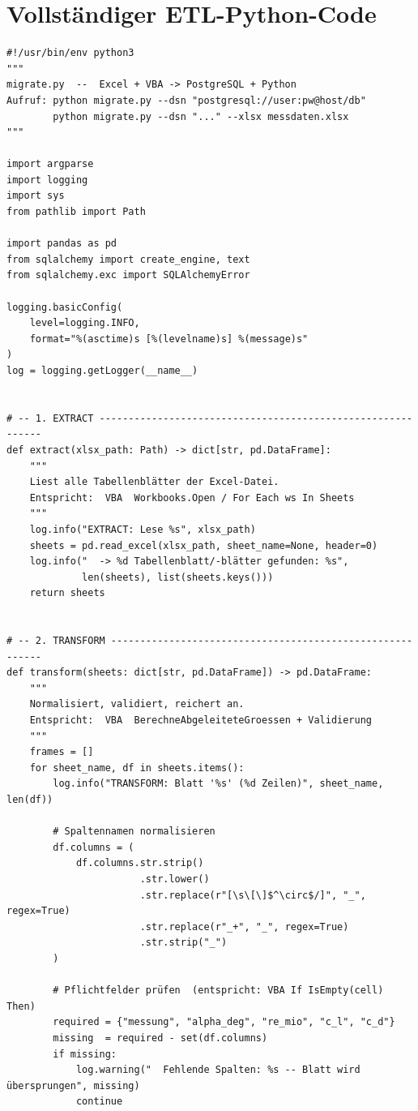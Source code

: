 ﻿\documentclass[12pt,a4paper]{report}
\theoremstyle{definition}
\theoremstyle{remark}
\begin{document}
\section{Vollständiger ETL-Python-Code}

\begin{lstlisting}[style=python, caption={migrate.py: Vollständige ETL-Pipeline}, label=lst:etl]
#!/usr/bin/env python3
"""
migrate.py  --  Excel + VBA -> PostgreSQL + Python
Aufruf: python migrate.py --dsn "postgresql://user:pw@host/db"
        python migrate.py --dsn "..." --xlsx messdaten.xlsx
"""

import argparse
import logging
import sys
from pathlib import Path

import pandas as pd
from sqlalchemy import create_engine, text
from sqlalchemy.exc import SQLAlchemyError

logging.basicConfig(
    level=logging.INFO,
    format="%(asctime)s [%(levelname)s] %(message)s"
)
log = logging.getLogger(__name__)


# -- 1. EXTRACT ------------------------------------------------------------
def extract(xlsx_path: Path) -> dict[str, pd.DataFrame]:
    """
    Liest alle Tabellenblätter der Excel-Datei.
    Entspricht:  VBA  Workbooks.Open / For Each ws In Sheets
    """
    log.info("EXTRACT: Lese %s", xlsx_path)
    sheets = pd.read_excel(xlsx_path, sheet_name=None, header=0)
    log.info("  -> %d Tabellenblatt/-blätter gefunden: %s",
             len(sheets), list(sheets.keys()))
    return sheets


# -- 2. TRANSFORM ----------------------------------------------------------
def transform(sheets: dict[str, pd.DataFrame]) -> pd.DataFrame:
    """
    Normalisiert, validiert, reichert an.
    Entspricht:  VBA  BerechneAbgeleiteteGroessen + Validierung
    """
    frames = []
    for sheet_name, df in sheets.items():
        log.info("TRANSFORM: Blatt '%s' (%d Zeilen)", sheet_name, len(df))

        # Spaltennamen normalisieren
        df.columns = (
            df.columns.str.strip()
                       .str.lower()
                       .str.replace(r"[\s\[\]$^\circ$/]", "_", regex=True)
                       .str.replace(r"_+", "_", regex=True)
                       .str.strip("_")
        )

        # Pflichtfelder prüfen  (entspricht: VBA If IsEmpty(cell) Then)
        required = {"messung", "alpha_deg", "re_mio", "c_l", "c_d"}
        missing  = required - set(df.columns)
        if missing:
            log.warning("  Fehlende Spalten: %s -- Blatt wird übersprungen", missing)
            continue


\end{lstlisting}
\end{document}
